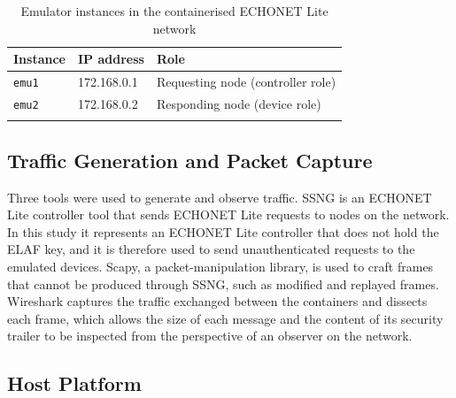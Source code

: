 \begin{table}[htbp]
  \centering
  \caption{Emulator instances in the containerised ECHONET Lite network}
  \label{tab:containers}
  \renewcommand{\arraystretch}{1.2}
  \begin{tabularx}{\textwidth}{@{}l l X@{}}
    \toprule
    \textbf{Instance} & \textbf{IP address}       & \textbf{Role}                                  \\
    \midrule
    \texttt{emu1}     & 172.168.0.1 \tbd{}        & Requesting node (controller role) \tbd{}       \\
    \texttt{emu2}     & 172.168.0.2 \tbd{}        & Responding node (device role) \tbd{}           \\
    \tbd{}            & \tbd{}                    & \tbd{}                                         \\
    \bottomrule
  \end{tabularx}
\end{table}

\subsection{Traffic Generation and Packet Capture}
\label{sec:i-tools}

Three tools were used to generate and observe traffic. SSNG is an ECHONET Lite controller tool that sends ECHONET Lite requests to nodes on the network. In this study it represents an ECHONET Lite controller that does not hold the ELAF key, and it is therefore used to send unauthenticated requests to the emulated devices. Scapy, a packet-manipulation library, is used to craft frames that cannot be produced through SSNG, such as modified and replayed frames. Wireshark captures the traffic exchanged between the containers and dissects each frame, which allows the size of each message and the content of its security trailer to be inspected from the perspective of an observer on the network.

\subsection{Host Platform}
\label{sec:i-host}

